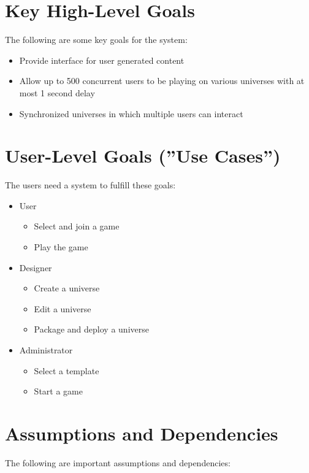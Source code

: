 \section{Key High-Level Goals}

The following are some key goals for the system:

\begin{itemize}
	\item Provide interface for user generated content
	\item Allow up to 500 concurrent users to be playing on various universes with at most 1 second delay
	\item Synchronized universes in which multiple users can interact
\end{itemize}

\section{User-Level Goals (''Use Cases'')}

The users need a system to fulfill these goals:

\begin{itemize}
	\item User
	\begin{itemize}
		\item Select and join a game
		\item Play the game
	\end{itemize}
	\item Designer
	\begin{itemize}
		\item Create a universe
		\item Edit a universe
		\item Package and deploy a universe
	\end{itemize}
	\item Administrator
	\begin{itemize}
		\item Select a template
		\item Start a game
	\end{itemize}
\end{itemize}

\section{Assumptions and Dependencies}

The following are important assumptions and dependencies:


